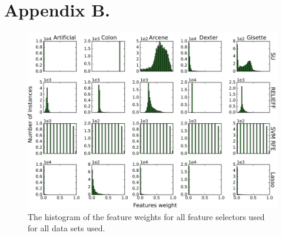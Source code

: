 \documentclass[twoside,11pt]{article}
\begin{document}
\section*{Appendix B.}
\label{app:appendixb}

\begin{figure}[h!]
  \centering
    \includegraphics[width=\textwidth]{feature_weights_hist.png}
  \caption{The histogram of the feature weights for all feature selectors used for all data sets used.}
  \label{fig:feature_weights_hist}
\end{figure}

\end{document}
